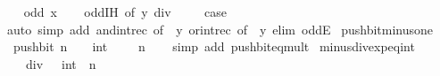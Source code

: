 \begin{isabellebody}
\isamarkupfalse%
\isanewline
\ \ \isamarkupfalse%
\ {\isacharparenleft}{\kern0pt}odd\ x{\isacharparenright}{\kern0pt}\isanewline
\ \ \isamarkupfalse%
\ odd{\isachardot}{\kern0pt}IH\ {\isacharbrackleft}{\kern0pt}of\ {\isacartoucheopen}y\ div\ {}{\isacartoucheclose}{\isacharbrackright}{\kern0pt}\isanewline
\ \ \isamarkupfalse%
\ {\isacharquery}{\kern0pt}case\isanewline
\ \ \ \ \isamarkupfalse%
\ {\isacharparenleft}{\kern0pt}auto\ simp\ add{\isacharcolon}{\kern0pt}\ and{\isacharunderscore}{\kern0pt}int{\isacharunderscore}{\kern0pt}rec\ {\isacharbrackleft}{\kern0pt}of\ {\isacharunderscore}{\kern0pt}\ y{\isacharbrackright}{\kern0pt}\ or{\isacharunderscore}{\kern0pt}int{\isacharunderscore}{\kern0pt}rec\ {\isacharbrackleft}{\kern0pt}of\ {\isacharunderscore}{\kern0pt}\ y{\isacharbrackright}{\kern0pt}\ elim{\isacharcolon}{\kern0pt}\ oddE{\isacharparenright}{\kern0pt}\isanewline
{}\isamarkupfalse%
%
\endisatagproof
{\isafoldproof}%
%
\isadelimproof
\isanewline
%
\endisadelimproof
\isanewline
{}\isamarkupfalse%
\ push{\isacharunderscore}{\kern0pt}bit{\isacharunderscore}{\kern0pt}minus{\isacharunderscore}{\kern0pt}one{\isacharcolon}{\kern0pt}\isanewline
\ \ {\isachardoublequoteopen}push{\isacharunderscore}{\kern0pt}bit\ n\ {\isacharparenleft}{\kern0pt}{\isacharminus}{\kern0pt}\ {}\ {\isacharcolon}{\kern0pt}{\isacharcolon}{\kern0pt}\ int{\isacharparenright}{\kern0pt}\ {\isacharequal}{\kern0pt}\ {\isacharminus}{\kern0pt}\ {\isacharparenleft}{\kern0pt}{}\ {\isacharcircum}{\kern0pt}\ n{\isacharparenright}{\kern0pt}{\isachardoublequoteclose}\isanewline
%
\isadelimproof
\ \ %
\endisadelimproof
%
\isatagproof
{}\isamarkupfalse%
\ {\isacharparenleft}{\kern0pt}simp\ add{\isacharcolon}{\kern0pt}\ push{\isacharunderscore}{\kern0pt}bit{\isacharunderscore}{\kern0pt}eq{\isacharunderscore}{\kern0pt}mult{\isacharparenright}{\kern0pt}%
\endisatagproof
{\isafoldproof}%
%
\isadelimproof
\isanewline
%
\endisadelimproof
\isanewline
{}\isamarkupfalse%
\ minus{\isacharunderscore}{\kern0pt}{}{\isacharunderscore}{\kern0pt}div{\isacharunderscore}{\kern0pt}exp{\isacharunderscore}{\kern0pt}eq{\isacharunderscore}{\kern0pt}int{\isacharcolon}{\kern0pt}\isanewline
\ \ {\isacartoucheopen}{\isacharminus}{\kern0pt}\ {}\ div\ {\isacharparenleft}{\kern0pt}{}\ {\isacharcolon}{\kern0pt}{\isacharcolon}{\kern0pt}\ int{\isacharparenright}{\kern0pt}\ {\isacharcircum}{\kern0pt}\ n\ {\isacharequal}{\kern0pt}\ {\isacharminus}{\kern0pt}\ {}{\isacartoucheclose}\isanewline

\end{isabellebody}
